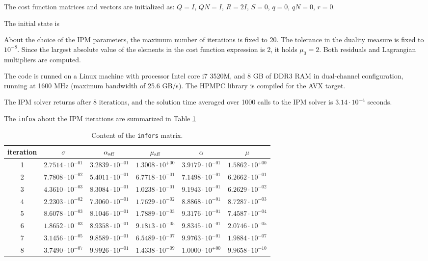 \documentclass[a4paper]{report}
\begin{document}
The cost function matrices and vectors are initialized as: $Q=I$, $QN=I$, $R=2I$, $S=0$, $q=0$, $qN=0$, $r=0$. 

The initial state is 

About the choice of the IPM parameters, the maximum number of iterations is fixed to 20.
The tolerance in the duality measure is fixed to $10^{-8}$.
Since the largest absolute value of the elements in the cost function expression is 2, it holds $\mu_0=2$.
Both residuals and Lagrangian multipliers are computed.

The code is runned on a Linux machine with processor Intel core i7 3520M, and 8 GB of DDR3 RAM in dual-channel configuration, running at 1600 MHz (maximum bandwidth of 25.6 GB/s).
The HPMPC library is compiled for the AVX target.

The IPM solver returns after 8 iterations, and the solution time averaged over 1000 calls to the IPM solver is $3.14\cdot 10^{-4}$ seconds.

The {\tt infos} about the IPM iterations are summarized in Table \ref{tab:infos}
\begin{table}
\centering
\caption{Content of the {\tt infors} matrix.}
\label{tab:infos}
\begin{tabular}{c|ccccc}
iteration & $\sigma$ & $\alpha_{\rm aff}$ & $\mu_{\rm aff}$ & $\alpha$ & $\mu$ \\ 
\hline
1 &   $2.7514\cdot 10^{-01}$ &  $3.2839\cdot 10^{-01}$ &  $1.3008\cdot 10^{+00}$ &  $3.9179\cdot 10^{-01}$ &  $1.5862\cdot 10^{+00}$ \\
2 &   $7.7808\cdot 10^{-02}$ &  $5.4011\cdot 10^{-01}$ &  $6.7718\cdot 10^{-01}$ &  $7.1498\cdot 10^{-01}$ &  $6.2662\cdot 10^{-01}$ \\
3 &   $4.3610\cdot 10^{-03}$ &  $8.3084\cdot 10^{-01}$ &  $1.0238\cdot 10^{-01}$ &  $9.1943\cdot 10^{-01}$ &  $6.2629\cdot 10^{-02}$ \\
4 &   $2.2303\cdot 10^{-02}$ &  $7.3060\cdot 10^{-01}$ &  $1.7629\cdot 10^{-02}$ &  $8.8868\cdot 10^{-01}$ &  $8.7287\cdot 10^{-03}$ \\
5 &   $8.6078\cdot 10^{-03}$ &  $8.1046\cdot 10^{-01}$ &  $1.7889\cdot 10^{-03}$ &  $9.3176\cdot 10^{-01}$ &  $7.4587\cdot 10^{-04}$ \\
6 &   $1.8652\cdot 10^{-03}$ &  $8.9358\cdot 10^{-01}$ &  $9.1813\cdot 10^{-05}$ &  $9.8345\cdot 10^{-01}$ &  $2.0746\cdot 10^{-05}$ \\
7 &   $3.1456\cdot 10^{-05}$ &  $9.8589\cdot 10^{-01}$ &  $6.5489\cdot 10^{-07}$ &  $9.9763\cdot 10^{-01}$ &  $1.9884\cdot 10^{-07}$ \\
8 &   $3.7490\cdot 10^{-07}$ &  $9.9926\cdot 10^{-01}$ &  $1.4338\cdot 10^{-09}$ &  $1.0000\cdot 10^{+00}$ &  $9.9658\cdot 10^{-10}$ \\
\end{tabular}
\end{table}
\end{document}
